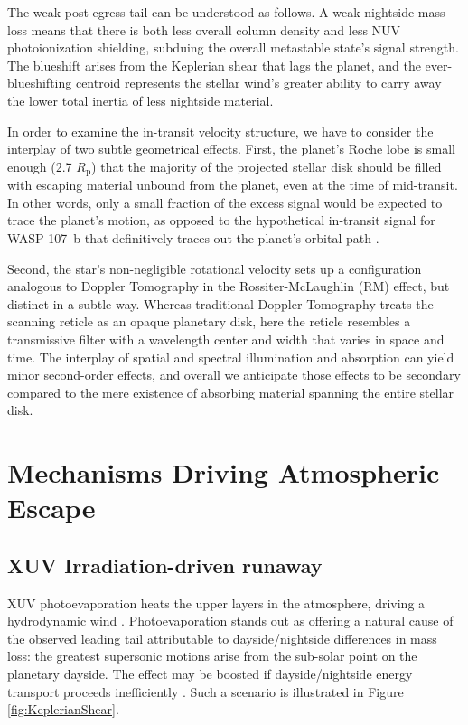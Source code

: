 \documentclass[twocolumn]{aastex631}
\begin{document}
The weak post-egress tail can be understood as follows.  A weak nightside mass loss means that there is both less overall column density and less NUV photoionization shielding, subduing the overall  metastable state's signal strength.  The blueshift arises from the Keplerian shear that lags the planet, and the ever-blueshifting centroid represents the stellar wind's greater ability to carry away the lower total inertia of less nightside material.

In order to examine the in-transit velocity structure, we have to consider the interplay of two subtle geometrical effects.  First, the planet's Roche lobe is small enough (2.7 $R_\mathrm{p}$) that the majority of the projected stellar disk should be filled with escaping material unbound from the planet, even at the time of mid-transit.  In other words, only a small fraction of the  excess signal would be expected to trace the planet's motion, as opposed to the hypothetical in-transit signal for WASP-107~b that definitively traces out the planet's orbital path \citep{2022ApJ...926..226M}.

Second, the star's non-negligible rotational velocity sets up a configuration analogous to Doppler Tomography in the Rossiter-McLaughlin (RM) effect, but distinct in a subtle way.  Whereas traditional Doppler Tomography treats the scanning reticle as an opaque planetary disk, here the reticle resembles a transmissive filter with a wavelength center and width that varies in space and time.  The interplay of spatial and spectral illumination and absorption can yield minor second-order effects, and overall we anticipate those effects to be secondary compared to the mere existence of absorbing material spanning the entire stellar disk.

\section{Mechanisms Driving Atmospheric Escape}\label{secPhysMech}

\subsection{XUV Irradiation-driven runaway}
XUV photoevaporation heats the upper layers in the atmosphere, driving a hydrodynamic wind \citep{2009ApJ...693...23M}.  Photoevaporation stands out as offering a natural cause of the observed leading tail attributable to dayside/nightside differences in mass loss: the greatest supersonic motions arise from the sub-solar point on the planetary dayside.  The effect may be boosted if dayside/nightside energy transport proceeds inefficiently \citep{2009ApJ...693...23M}.  Such a scenario is illustrated in Figure \ref{fig:KeplerianShear}.
\end{document}

